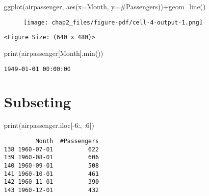 \documentclass[
  letterpaper,
  DIV=11,
  numbers=noendperiod]{scrreprt}
\newenvironment{Shaded}{\begin{snugshade}}{\end{snugshade}}
\newcommand{\BuiltInTok}[1]{\textcolor[rgb]{0.00,0.23,0.31}{#1}}
\newcommand{\DecValTok}[1]{\textcolor[rgb]{0.68,0.00,0.00}{#1}}
\newcommand{\NormalTok}[1]{\textcolor[rgb]{0.00,0.23,0.31}{#1}}
\newcommand{\OperatorTok}[1]{\textcolor[rgb]{0.37,0.37,0.37}{#1}}
\newcommand{\StringTok}[1]{\textcolor[rgb]{0.13,0.47,0.30}{#1}}
\begin{document}
\begin{Shaded}
\begin{Highlighting}[]
\NormalTok{ggplot(airpassenger, aes(x}\OperatorTok{=}\StringTok{\textquotesingle{}Month\textquotesingle{}}\NormalTok{, y}\OperatorTok{=}\StringTok{\textquotesingle{}\#Passengers\textquotesingle{}}\NormalTok{))}\OperatorTok{+}\NormalTok{geom\_line()}
\end{Highlighting}
\end{Shaded}

\begin{figure}[H]

{\centering \texttt{[image: chap2\_files/figure-pdf/cell-4-output-1.png]}

}

\end{figure}

\begin{verbatim}
<Figure Size: (640 x 480)>
\end{verbatim}

\begin{Shaded}
\begin{Highlighting}[]
\BuiltInTok{print}\NormalTok{(airpassenger[}\StringTok{\textquotesingle{}Month\textquotesingle{}}\NormalTok{].}\BuiltInTok{min}\NormalTok{())}
\end{Highlighting}
\end{Shaded}

\begin{verbatim}
1949-01-01 00:00:00
\end{verbatim}

\hypertarget{subseting}{%
\section{Subseting}\label{subseting}}

\begin{Shaded}
\begin{Highlighting}[]
\BuiltInTok{print}\NormalTok{(airpassenger.iloc[}\OperatorTok{{-}}\DecValTok{6}\NormalTok{:, :}\DecValTok{6}\NormalTok{])}
\end{Highlighting}
\end{Shaded}

\begin{verbatim}
         Month  #Passengers
138 1960-07-01          622
139 1960-08-01          606
140 1960-09-01          508
141 1960-10-01          461
142 1960-11-01          390
143 1960-12-01          432
\end{verbatim}
\end{document}
